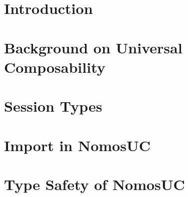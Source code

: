 \documentclass[acmsmall,screen,review,anonymous]{acmart}
\begin{document}
\maketitle




\section{Introduction} \label{sec:intro}


\section{Background on Universal Composability} \label{sec:background}


\section{Session Types} \label{sec:comexample}


%

%

\section{Import in NomosUC} \label{sec:motivate}


%
%
%

\section{Type Safety of NomosUC} \label{sec:safety}

\end{document}
